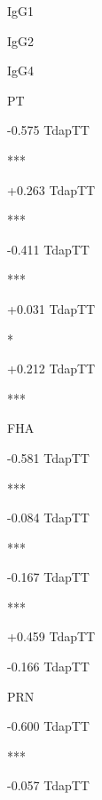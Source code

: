 \documentclass[
]{article}
\begin{document}
IgG1

IgG2

IgG4

PT

{-0.575} {{Tdap}{TT}}

{}{}

{}{}

***

{+0.263} {{Tdap}{TT}}

{}{}

{}{}

***

{-0.411} {{Tdap}{TT}}

{}{}

{}{}

***

{+0.031} {{Tdap}{TT}}

{}{}

{}{}

*

{+0.212} {{Tdap}{TT}}

{}{}

{}{}

***

FHA

{-0.581} {{Tdap}{TT}}

{}{}

{}{}

***

{-0.084} {{Tdap}{TT}}

{}{}

{}{}

***

{-0.167} {{Tdap}{TT}}

{}{}

{}{}

***

{+0.459} {{Tdap}{TT}}

{}{}

{}{}

{}

{-0.166} {{Tdap}{TT}}

{}{}

{}{}

{}

PRN

{-0.600} {{Tdap}{TT}}

{}{}

{}{}

***

{-0.057} {{Tdap}{TT}}

{}{}

{}{}
\end{document}
